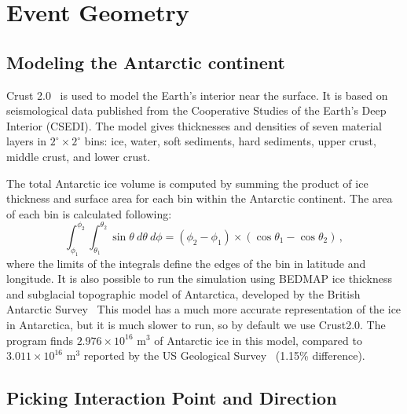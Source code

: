 \section{Event Geometry}
\label{sec:eventGeometry}

\subsection{Modeling the Antarctic continent}
Crust 2.0~\cite{crust2} is used to model the Earth's interior near the 
surface.  It is based on seismological data published from the Cooperative Studies of the Earth's Deep Interior (CSEDI).
The model gives thicknesses and densities of seven material
layers in $2^{\circ} \times 2^{\circ}$ bins:  ice, water, soft sediments, hard sediments, upper crust,
middle crust, and lower crust.  

The total Antarctic ice volume is computed by summing the product of ice
thickness and surface area for each bin within the Antarctic continent.
The area of each bin is calculated following:
\begin{equation}
\int_{\phi_1}^{\phi_2}\int_{\theta_1}^{\theta_2}\sin{\theta}~d\theta~d\phi=\left(\phi_2-\phi_1\right)\times\left(\cos{\theta_1}-\cos{\theta_2}\right) \, ,
\end{equation}
\noindent where the limits of the integrals define the edges of the bin in
latitude and longitude.
It is also possible to run the simulation using BEDMAP ice thickness
and subglacial topographic model of Antarctica, developed by the
British Antarctic Survey~\cite{bedmap}
This model has a much more accurate representation of the ice in
Antarctica, but it is much slower to run, so by default we use
Crust2.0.
The \icemc program finds $2.976 \times 10^{16}$ m$^3$ of Antarctic ice in this model, compared to $3.011 \times 10^{16}$ m$^3$ reported by the US Geological Survey~\cite{usgs} (1.15\% difference).

\subsection{Picking Interaction Point and Direction}
\label{sec:pickneutrino}

